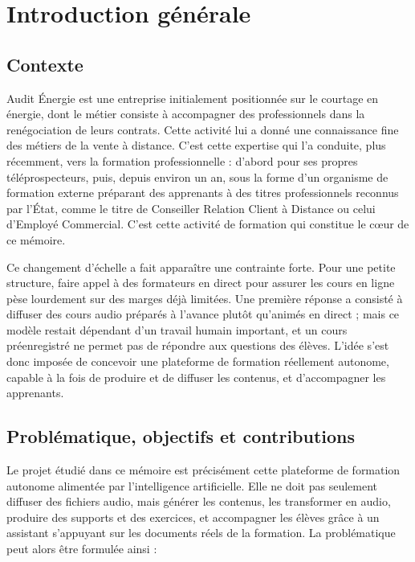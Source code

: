 \documentclass[12pt,a4paper]{article}
\begin{document}
\clearpage
{}
{}
\tableofcontents

\clearpage
{}

{}
\section*{Introduction générale}

\subsection*{Contexte}

Audit Énergie est une entreprise initialement positionnée sur le courtage en énergie, dont
le métier consiste à accompagner des professionnels dans la renégociation de leurs contrats.
Cette activité lui a donné une connaissance fine des métiers de la vente à distance. C'est
cette expertise qui l'a conduite, plus récemment, vers la formation professionnelle :
d'abord pour ses propres téléprospecteurs, puis, depuis environ un an, sous la forme d'un
organisme de formation externe préparant des apprenants à des titres professionnels reconnus
par l'État, comme le titre de Conseiller Relation Client à Distance ou celui d'Employé
Commercial. C'est cette activité de formation qui constitue le cœur de ce mémoire.

Ce changement d'échelle a fait apparaître une contrainte forte. Pour une petite structure,
faire appel à des formateurs en direct pour assurer les cours en ligne pèse lourdement sur
des marges déjà limitées. Une première réponse a consisté à diffuser des cours audio préparés
à l'avance plutôt qu'animés en direct ; mais ce modèle restait dépendant d'un travail humain
important, et un cours préenregistré ne permet pas de répondre aux questions des élèves.
L'idée s'est donc imposée de concevoir une plateforme de formation réellement autonome,
capable à la fois de produire et de diffuser les contenus, et d'accompagner les apprenants.

\subsection*{Problématique, objectifs et contributions}

Le projet étudié dans ce mémoire est précisément cette plateforme de formation autonome
alimentée par l'intelligence artificielle. Elle ne doit pas seulement diffuser des fichiers
audio, mais générer les contenus, les transformer en audio, produire des supports et des
exercices, et accompagner les élèves grâce à un assistant s'appuyant sur les documents réels
de la formation. La problématique peut alors être formulée ainsi :
\end{document}

